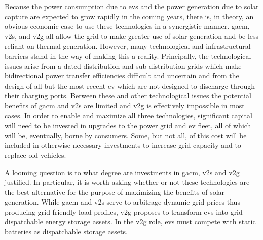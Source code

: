 \documentclass[12pt]{article}
\begin{document}
Because the power consumption due to \glspl{ev} and the power generation due to solar capture are expected to grow rapidly in the coming years, there is, in theory, an obvious economic case to use these technologies in a synergistic manner. \gls{gacm}, \gls{v2s}, and \gls{v2g} all allow the grid to make greater use of solar generation and be less reliant on thermal generation. However, many technological and infrastructural barriers stand in the way of making this a reality. Principally, the technological issues arise from a dated distribution and sub-distribution grids which make bidirectional power transfer efficiencies difficult and uncertain and from the design of all but the most recent \gls{ev} which are not designed to discharge through their charging ports. Between these and other technological issues the potential benefits of \gls{gacm} and \gls{v2s} are limited and \gls{v2g} is effectively impossible in most cases. In order to enable and maximize all three technologies, significant capital will need to be invested in upgrades to the power grid and \gls{ev} fleet, all of which will be, eventually, borne by consumers. Some, but not all, of this cost will be included in otherwise necessary investments to increase grid capacity and to replace old vehicles.

A looming question is to what degree are investments in \gls{gacm}, \gls{v2s} and \gls{v2g} justified. In particular, it is worth asking whether or not these technologies are the best alternative for the purpose of maximizing the benefits of solar generation. While \gls{gacm} and \gls{v2s} serve to arbitrage dynamic grid prices thus producing grid-friendly load profiles, \gls{v2g} proposes to transform \glspl{ev} into grid-dispatchable energy storage assets. In the \gls{v2g} role, \glspl{ev} must compete with static batteries as dispatchable storage assets.
\end{document}
